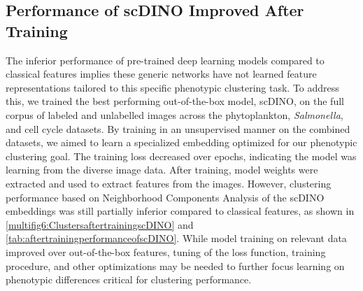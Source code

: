\documentclass[12pt,a4paper]{article}
\begin{document}

\subsection{Performance of scDINO Improved After Training}

The inferior performance of pre-trained deep learning models compared to classical features implies these generic networks have not learned feature representations tailored to this specific phenotypic clustering task. To address this, we trained the best performing out-of-the-box model, scDINO, on the full corpus of labeled and unlabelled images across the phytoplankton, \textit{Salmonella}, and cell cycle datasets. By training in an unsupervised manner on the combined datasets, we aimed to learn a specialized embedding optimized for our phenotypic clustering goal. The training loss decreased over epochs, indicating the model was learning from the diverse image data. After training, model weights were extracted and used to extract features from the images. However, clustering performance based on Neighborhood Components Analysis of the scDINO embeddings was still partially inferior compared to classical features, as shown in \ref{multifig6:ClustersaftertrainingscDINO} and \ref{tab:aftertrainingperformanceofscDINO}. While model training on relevant data improved over out-of-the-box features, tuning of the loss function, training procedure, and other optimizations may be needed to further focus learning on phenotypic differences critical for clustering performance.
\end{document}
